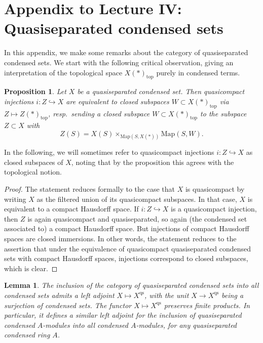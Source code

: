 \documentclass[11pt]{amsbook}
\numberwithin{equation}{section}
\numberwithin{theorem}{section}
\newtheorem{lemma}[theorem]{Lemma}
\newtheorem{proposition}[theorem]{Proposition}
\theoremstyle{definition}
\begin{document}
\newpage

\section*{Appendix to Lecture IV: Quasiseparated condensed sets}

In this appendix, we make some remarks about the category of quasiseparated condensed sets. We start with the following critical observation, giving an interpretation of the topological space $X(\ast)_{\mathrm{top}}$ purely in condensed terms.

\begin{proposition} Let $X$ be a quasiseparated condensed set. Then quasicompact injections $i:Z\hookrightarrow X$ are equivalent to closed subspaces $W\subset X(\ast)_{\mathrm{top}}$ via $Z\mapsto Z(\ast)_{\mathrm{top}}$, resp.~sending a closed subspace $W\subset X(\ast)_{\mathrm{top}}$ to the subspace $Z\subset X$ with
\[
Z(S) = X(S)\times_{\mathrm{Map}(S,X(\ast))} \mathrm{Map}(S,W).
\]
\end{proposition}

In the following, we will sometimes refer to quasicompact injections $i: Z\hookrightarrow X$ as closed subspaces of $X$, noting that by the proposition this agrees with the topological notion.

\begin{proof} The statement reduces formally to the case that $X$ is quasicompact by writing $X$ as the filtered union of its quasicompact subspaces. In that case, $X$ is equivalent to a compact Hausdorff space. If $i: Z\hookrightarrow X$ is a quasicompact injection, then $Z$ is again quasicompact and quasiseparated, so again (the condensed set associated to) a compact Hausdorff space. But injections of compact Hausdorff spaces are closed immersions. In other words, the statement reduces to the assertion that under the equivalence of quasicompact quasiseparated condensed sets with compact Hausdorff spaces, injections correspond to closed subspaces, which is clear.
\end{proof}

\begin{lemma} The inclusion of the category of quasiseparated condensed sets into all condensed sets admits a left adjoint $X\mapsto X^{\mathrm{qs}}$, with the unit $X\to X^{\mathrm{qs}}$ being a surjection of condensed sets. The functor $X\mapsto X^{\mathrm{qs}}$ preserves finite products. In particular, it defines a similar left adjoint for the inclusion of quasiseparated condensed $A$-modules into all condensed $A$-modules, for any quasiseparated condensed ring $A$.
\end{lemma}
\end{document}
